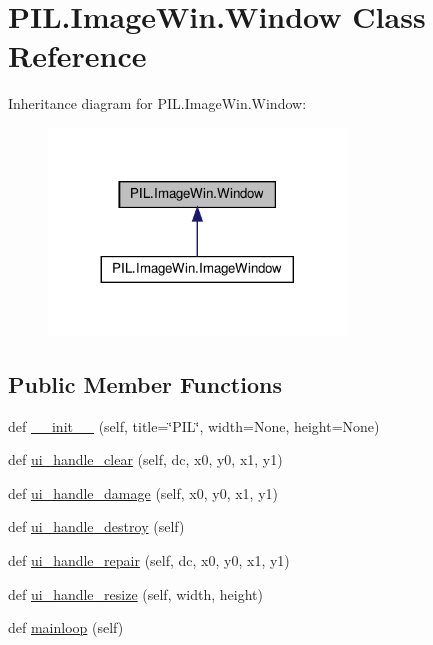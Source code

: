 \hypertarget{classPIL_1_1ImageWin_1_1Window}{}\section{P\+I\+L.\+Image\+Win.\+Window Class Reference}
\label{classPIL_1_1ImageWin_1_1Window}


Inheritance diagram for P\+I\+L.\+Image\+Win.\+Window\+:
\nopagebreak
\begin{figure}[H]
\begin{center}
\leavevmode
\includegraphics[width=224pt]{classPIL_1_1ImageWin_1_1Window__inherit__graph}
\end{center}
\end{figure}
\subsection*{Public Member Functions}
\begin{DoxyCompactItemize}
\item 
def \hyperlink{classPIL_1_1ImageWin_1_1Window_a0fc79a05d8d0792ce1807e8876f6d315}{\+\_\+\+\_\+init\+\_\+\+\_\+} (self, title=\char`\"{}P\+IL\char`\"{}, width=None, height=None)
\item 
def \hyperlink{classPIL_1_1ImageWin_1_1Window_a908e56999aead234f11fa9268f55d801}{ui\+\_\+handle\+\_\+clear} (self, dc, x0, y0, x1, y1)
\item 
def \hyperlink{classPIL_1_1ImageWin_1_1Window_afa5d174e3be87f39cdcc02987a81407c}{ui\+\_\+handle\+\_\+damage} (self, x0, y0, x1, y1)
\item 
def \hyperlink{classPIL_1_1ImageWin_1_1Window_a9037944af695e29128708b0ccd0050a4}{ui\+\_\+handle\+\_\+destroy} (self)
\item 
def \hyperlink{classPIL_1_1ImageWin_1_1Window_a11b453dd9366ef98120c46e6a333de39}{ui\+\_\+handle\+\_\+repair} (self, dc, x0, y0, x1, y1)
\item 
def \hyperlink{classPIL_1_1ImageWin_1_1Window_a920c87d444d1a27aa4751b14ec108473}{ui\+\_\+handle\+\_\+resize} (self, width, height)
\item 
def \hyperlink{classPIL_1_1ImageWin_1_1Window_a7204bd1ab1a17babf4ffe45a3033615e}{mainloop} (self)
\end{DoxyCompactItemize}
